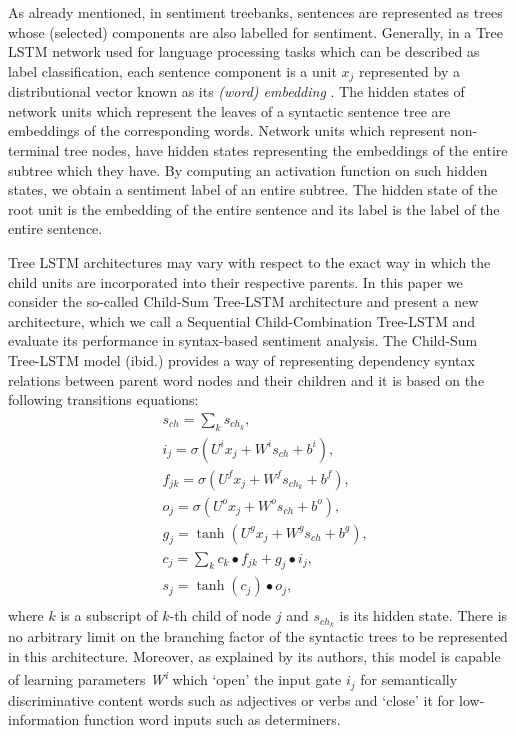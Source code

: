 \documentclass[10pt, a4paper]{article}
\begin{document}
As already mentioned, in sentiment treebanks, sentences are represented as trees whose (selected) components are also labelled for sentiment. Generally, in a Tree LSTM network used for language processing tasks which can be described as label classification, each sentence component is a unit $x_j$ represented by a distributional vector known as its \textit{(word) embedding} \cite{mikolov2013distributed}. The hidden states of network units which represent the leaves of a syntactic sentence tree are embeddings of the corresponding words. Network units which represent non-terminal tree nodes, have hidden states representing the embeddings of the entire subtree which they have. By computing an activation function on such hidden states, we obtain a sentiment label of an entire subtree. The hidden state of the root unit is the embedding of the entire sentence and its label is the label of the entire sentence.
\par	Tree LSTM architectures may vary with respect to the exact way in which the child units are incorporated into their respective parents. In this paper we consider the so-called Child-Sum Tree-LSTM architecture \cite{tai2015improved} and present a new architecture, which we call a Sequential Child-Combination Tree-LSTM and evaluate its performance in syntax-based sentiment analysis. The Child-Sum Tree-LSTM model (ibid.) provides a way of representing dependency syntax relations between parent word nodes and their children and it is based on the following transitions equations:
\begin{equation}
\begin{split}
&s_{ch}=\sum_{k}s_{ch_k},\\
&i_j = \sigma(U^ix_j + W^is_{ch} + b^i) ,\\
&f_{jk} = \sigma(U^fx_j + W^fs_{ch_k} + b^f) ,\\
&o_j = \sigma(U^ox_j + W^os_{ch} + b^o) ,\\
&g_j = \tanh(U^gx_j+ W^gs_{ch} + b^g) ,\\
&c_j = \sum_{k} c_k \bullet f_{jk} + g_{j} \bullet i_{j} ,\\
&s_j = \tanh({c_{j}}) \bullet o_{j},\\
\end{split}
\end{equation}
	where $k$ is a subscript of $k$-th child of node $j$ and $s_{ch_k}$ is its hidden state. There is no arbitrary limit on the branching factor of the syntactic trees to be represented in this architecture. Moreover, as explained by its authors, this model is capable of learning parameters \textit{W\textsuperscript{i}} which `open' the input gate \textit{$i_{j}$} for semantically discriminative content words such as adjectives or verbs and `close' it for low-information function word inputs such as determiners. 
\end{document}
